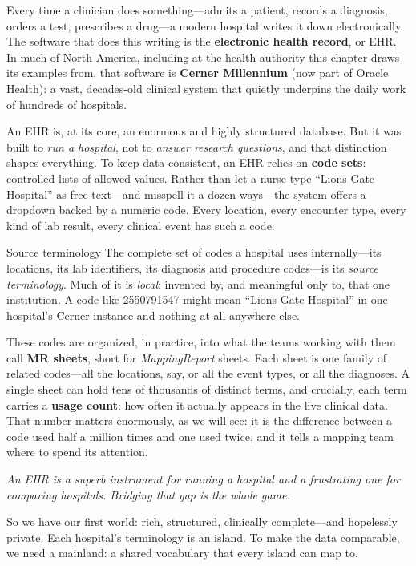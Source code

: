 \documentclass[12pt,openany]{book}
\newcommand{\pullquote}[1]{%
  \begin{center}\smallskip
  {\sffamily\itshape\large\color{cometbrown} #1}\smallskip\end{center}}
\newcommand{\code}[1]{{\ttfamily\small #1}}
\begin{document}
Every time a clinician does something---admits a patient, records a diagnosis, orders a test,
prescribes a drug---a modern hospital writes it down electronically. The software that does this
writing is the \textbf{electronic health record}, or EHR. In much of North America, including at the
health authority this chapter draws its examples from, that software is \textbf{Cerner Millennium}
(now part of Oracle Health): a vast, decades-old clinical system that quietly underpins the daily work
of hundreds of hospitals.

An EHR is, at its core, an enormous and highly structured database. But it was built to \emph{run a
hospital}, not to \emph{answer research questions}, and that distinction shapes everything. To keep
data consistent, an EHR relies on \textbf{code sets}: controlled lists of allowed values. Rather than
let a nurse type ``Lions Gate Hospital'' as free text---and misspell it a dozen ways---the system
offers a dropdown backed by a numeric code. Every location, every encounter type, every kind of lab
result, every clinical event has such a code.

\begin{definition}{Source terminology}
The complete set of codes a hospital uses internally---its locations, its lab identifiers, its
diagnosis and procedure codes---is its \emph{source terminology}. Much of it is \emph{local}: invented
by, and meaningful only to, that one institution. A code like \code{2550791547} might mean ``Lions
Gate Hospital'' in one hospital's Cerner instance and nothing at all anywhere else.
\end{definition}

These codes are organized, in practice, into what the teams working with them call \textbf{MR
sheets}, short for \emph{MappingReport} sheets. Each sheet is one family of related codes---all the
locations, say, or all the event types, or all the diagnoses. A single sheet can hold tens of
thousands of distinct terms, and crucially, each term carries a \textbf{usage count}: how often it
actually appears in the live clinical data. That number matters enormously, as we will see: it is the
difference between a code used half a million times and one used twice, and it tells a mapping team
where to spend its attention.

\pullquote{An EHR is a superb instrument for running a hospital and a frustrating one for comparing
hospitals. Bridging that gap is the whole game.}

So we have our first world: rich, structured, clinically complete---and hopelessly private. Each
hospital's terminology is an island. To make the data comparable, we need a mainland: a shared
vocabulary that every island can map to.
\end{document}
